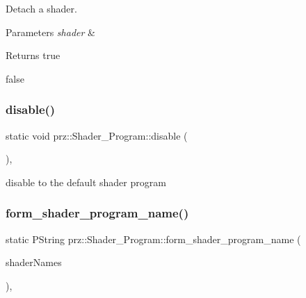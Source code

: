 Detach a shader. 


\begin{DoxyParams}{Parameters}
{\em shader} & \\
\hline
\end{DoxyParams}
\begin{DoxyReturn}{Returns}
true 

false 
\end{DoxyReturn}
\mbox{\label{classprz_1_1_shader___program_ab63e89654d2099c6c7b56f085f3a370f}} 
\subsubsection{\texorpdfstring{disable()}{disable()}}
{\footnotesize\ttfamily static void prz\+::\+Shader\+\_\+\+Program\+::disable (\begin{DoxyParamCaption}{ }\end{DoxyParamCaption})\hspace{0.3cm}{\ttfamily [inline]}, {\ttfamily [static]}}



disable to the default shader program 

\mbox{\label{classprz_1_1_shader___program_ade1a6d9e240cfa6e5880bdff8493c5af}} 
\subsubsection{\texorpdfstring{form\_shader\_program\_name()}{form\_shader\_program\_name()}\hspace{0.1cm}{\footnotesize\ttfamily [1/2]}}
{\footnotesize\ttfamily static P\+String prz\+::\+Shader\+\_\+\+Program\+::form\+\_\+shader\+\_\+program\+\_\+name (\begin{DoxyParamCaption}\item[{P\+Buffer$<$ P\+String $>$ \&}]{shader\+Names }\end{DoxyParamCaption})\hspace{0.3cm}{\ttfamily [inline]}, {\ttfamily [static]}}



